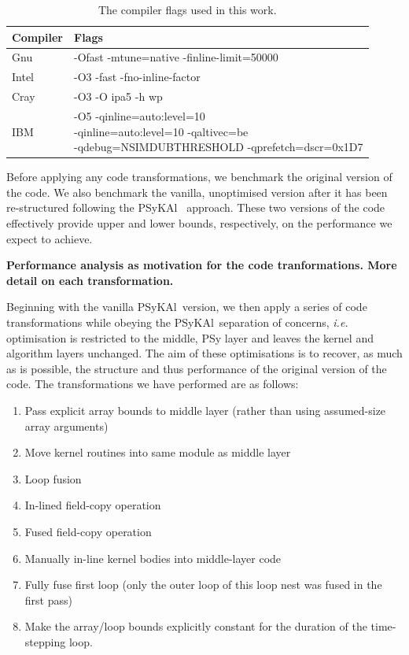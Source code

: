 \documentclass[journal]{IEEEtran}
\newcommand{\psykal}{{PS}y{KA}l\ }
\begin{document}
\begin{table}[!t]
\renewcommand{\arraystretch}{1.3}
\caption{The compiler flags used in this work.}
\label{TABLE_compiler_flags}
\centering
\begin{tabular}{l|l}
\hline
Compiler  &  Flags \\
\hline
Gnu       & -Ofast -mtune=native -finline-limit=50000    \\
Intel     & -O3 -fast -fno-inline-factor    \\
Cray      & -O3 -O ipa5 -h wp               \\
IBM       & \parbox{5cm}{-O5 -qinline=auto:level=10\\ -qinline=auto:level=10 -qaltivec=be\\ -qdebug=NSIMDUBTHRESHOLD -qprefetch=dscr=0x1D7} \\
\hline
\end{tabular}
\end{table}

Before applying any code transformations, we benchmark the original
version of the code. We also benchmark the vanilla, unoptimised
version after it has been re-structured following the \psykal
approach. These two versions of the code effectively provide upper and
lower bounds, respectively, on the performance we expect to achieve.

{\bf Performance analysis as motivation for the code
  tranformations. More detail on each transformation.}

Beginning with the vanilla \psykal version, we then apply a series of
code transformations while obeying the \psykal separation of concerns,
{\it i.e.} optimisation is restricted to the middle, {PS}y layer and leaves
the kernel and algorithm layers unchanged. The aim of these
optimisations is to recover, as much as is possible, the structure and
thus performance of the original version of the code. The
transformations we have performed are as follows:
\begin{enumerate}

\item Pass explicit array bounds to middle layer (rather than using
  assumed-size array arguments)

\item Move kernel routines into same module as middle layer

\item Loop fusion

\item In-lined field-copy operation

\item Fused field-copy operation

\item Manually in-line kernel bodies into middle-layer code

\item Fully fuse first loop (only the outer loop of this loop nest was
  fused in the first pass)

\item Make the array/loop bounds explicitly constant for the
      duration of the time-stepping loop.
\end{enumerate}
\end{document}
